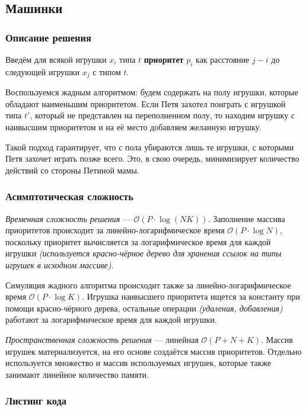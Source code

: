 \subsection{Машинки}

\subsubsection{Описание решения}

Введём для всякой игрушки \( x_i \) типа \( t \) \textbf{приоритет} \( p_i \) как расстояние \( j-i \) до следующей игрушки \( x_j \) с типом \( t \).

Воспользуемся жадным алгоритмом: будем содержать на полу игрушки, которые обладают наименьшим приоритетом. Если Петя захотел поиграть с игрушкой типа \( t' \), который не представлен на переполненном полу, то находим игрушку с наивысшим приоритетом и на её место добавляем желанную игрушку.

Такой подход гарантирует, что с пола убираются лишь те игрушки, с которыми Петя захочет играть позже всего. Это, в свою очередь, минимизирует количество действий со стороны Петиной мамы.

\subsubsection{Асимптотическая сложность}

\textit{Временная сложность решения} --- \( \mathcal{O}(P\cdot\log (NK)) \). Заполнение массива приоритетов происходит за линейно-логарифмическое время \( \mathcal{O}(P\cdot\log N) \), поскольку приоритет вычисляется за логарифмическое время для каждой игрушки \textit{(используется красно-чёрное дерево для хранения ссылок на типы игрушек в исходном массиве)}.

Симуляция жадного алгоритма происходит также за линейно-логарифмическое время \( \mathcal{O}(P\cdot\log K) \). Игрушка наивысшего приоритета ищется за константу при помощи красно-чёрного дерева, остальные операции \textit{(удаления, добавления)} работают за логарифмическое время для каждой игрушки.

\textit{Пространственная сложность решения} --- линейная \( \mathcal{O}(P+N+K) \). Массив игрушек материализуется, на его основе создаётся массив приоритетов. Отдельно используется множество и массив используемых игрушек, которые также занимают линейное количество памяти.

\subsubsection{Листинг кода}

